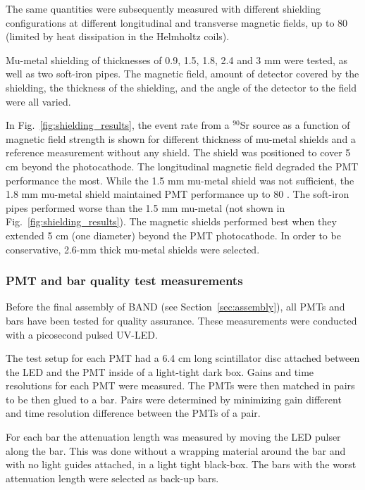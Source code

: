 \documentclass[3p,final,twocolumn]{elsarticle}
\begin{document}
  The same quantities were subsequently measured with different
  shielding configurations at different longitudinal and transverse
  magnetic fields, up to 80 \si{\gauss} (limited by heat dissipation in the
  Helmholtz coils).

 Mu-metal shielding of thicknesses of 0.9, 1.5, 1.8,
  2.4 and 3 \si{\milli\meter} were tested, as well as two soft-iron pipes. The magnetic field, amount of detector covered by the
  shielding, the thickness of the shielding, and the angle of the detector to the field were
  all varied.
  
In Fig.~\ref{fig:shielding_results}, the event rate from a $^{90}$Sr source as a function of magnetic field strength is shown for different thickness of mu-metal shields and a reference measurement without any shield. The shield was positioned to cover 5 \si{\centi\meter} beyond the photocathode. 
The longitudinal magnetic field degraded the PMT performance
the most.  While the 1.5 \si{\milli\meter} mu-metal shield was not
sufficient, the 1.8 \si{\milli\meter} mu-metal shield maintained PMT
performance up to 80 \si{\gauss}.  The soft-iron pipes performed worse than the
1.5 \si{\milli\meter} mu-metal (not shown in Fig.~\ref{fig:shielding_results}). The magnetic shields performed best when they
extended 5 \si{\centi\meter} (one diameter) beyond the PMT photocathode.  In order to
be conservative, 2.6-mm thick mu-metal shields were selected.




\subsubsection{PMT and bar quality test measurements}
Before the final assembly of BAND (see Section~\ref{sec:assembly}), all PMTs and bars have been tested for quality assurance. These measurements were conducted with a picosecond pulsed UV-LED.

The test setup for each PMT had a 6.4 \si{\centi\meter} long scintillator disc attached between the LED and the PMT inside of a light-tight dark box. Gains and time resolutions for each PMT were measured. The PMTs were then matched in pairs to be then glued to a bar. Pairs were determined by minimizing gain different and time resolution difference between the PMTs of a pair.

For each bar the attenuation length was measured by moving the LED pulser along the bar. This was done without a wrapping material around the bar and with no light guides attached, in a light tight black-box. The bars with the worst attenuation length were selected as back-up bars.
\end{document}
